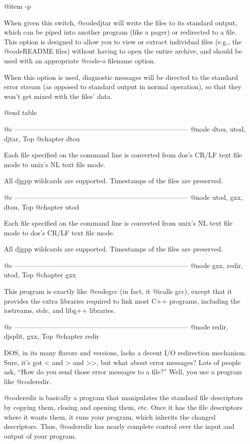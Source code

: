 @item -p

When given this switch, @code{djtar} will write the files to its standard
output, which can be piped into another program (like a pager) or
redirected to a file.  This option is designed to allow you to view or
extract individual files (e.g., the @code{README} files) without having to
open the entire archive, and should be used with an appropriate @code{-o
filename} option.

When this option is used, diagnostic messages will be directed to the
standard error stream (as opposed to standard output in normal operation),
so that they won't get mixed with the files' data.

@end table

@c -----------------------------------------------------------------------------
@node dtou, utod, djtar, Top
@chapter dtou

Each file specified on the command line is converted from dos's CR/LF
text file mode to unix's NL text file mode.

All djgpp wildcards are supported.  Timestamps of the files are preserved.

@c -----------------------------------------------------------------------------
@node utod, gxx, dtou, Top
@chapter utod

Each file specified on the command line is converted from unix's NL text
file mode to dos's CR/LF text file mode.

All djgpp wildcards are supported.  Timestamps of the files are preserved.

@c -----------------------------------------------------------------------------
@node gxx, redir, utod, Top
@chapter gxx

This program is exactly like @code{gcc} (in fact, it @i{calls} gcc), except
that it provides the extra libraries required to link most C++ programs,
including the iostreams, stdc, and libg++ libraries.

@c -----------------------------------------------------------------------------
@node    redir, djsplit, gxx, Top
@chapter redir

DOS, in its many flavors and versions, lacks a decent I/O redirection
mechanism.  Sure, it's got < and > and >>, but what about error
messages?  Lots of people ask, ``How do you send those error messages
to a file?''  Well, you use a program like @code{redir}.

@code{redir} is basically a program that manipulates the standard file
descriptors by copying them, closing and opening them, etc.  Once it
has the file descriptors where it wants them, it runs your program,
which inherits the changed descriptors.  Thus, @code{redir} has nearly
complete control over the input and output of your program.

